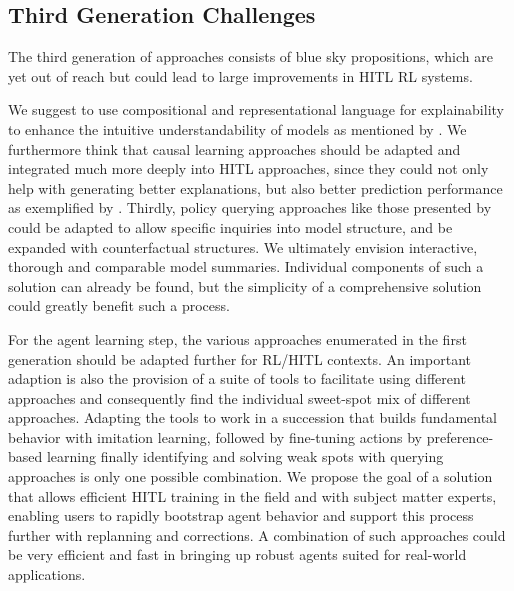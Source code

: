 \documentclass[twoside,11pt]{article}
\begin{document}
\subsection{Third Generation Challenges}
\label{sec:ThirdGeneration}

The third generation of approaches consists of blue sky propositions, which are yet out of reach but could lead to large improvements in HITL RL systems.


We suggest to use compositional and representational language for explainability to enhance the intuitive understandability of models as mentioned by \citet{RoyEtAl:2021:RLRoboticsChallenges}. We furthermore think that causal learning approaches should be adapted and integrated much more deeply into HITL approaches, since they could not only help with generating better explanations, but also better prediction performance as exemplified by \citet{MadumalEtAl:2020:CausalRLCFs}. Thirdly, policy querying approaches like those presented by \citet{HayesShah:2017:AutonomousPolicyExplanation} could be adapted to allow specific inquiries into model structure, and be expanded with counterfactual structures.
We ultimately envision interactive, thorough and comparable model summaries. Individual components of such a solution can already be found, but the simplicity of a comprehensive solution could greatly benefit such a process.



For the agent learning step, the various approaches enumerated in the first generation should be adapted further for RL/HITL contexts. An important adaption is also the provision of a suite of tools to facilitate using different approaches and consequently find the individual sweet-spot mix of different approaches. Adapting the tools to work in a succession that builds fundamental behavior with imitation learning, followed by fine-tuning actions by preference-based learning finally identifying and solving weak spots with querying approaches is only one possible combination.
We propose the goal of a solution that allows efficient HITL training in the field and with subject matter experts, enabling users to rapidly bootstrap agent behavior and support this process further with replanning and corrections. A combination of such approaches could be very efficient and fast in bringing up robust agents suited for real-world applications.
\end{document}
